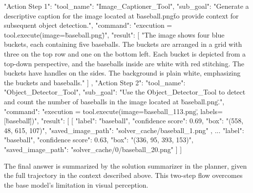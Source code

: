 \begin{answerbox}
\begin{answercodebox}
"Action Step 1": {
    "tool_name": "Image_Captioner_Tool",
    "sub_goal": "Generate a descriptive caption for the image located at \"baseball.png\" to provide context for subsequent object detection.",
    "command": "execution = tool.execute(image=\"baseball.png\")",
    "result": [
        "The image shows four blue buckets, each containing five baseballs. The buckets are arranged in a grid with three on the top row and one on the bottom left. Each bucket is depicted from a top-down perspective, and the baseballs inside are white with red stitching. The buckets have handles on the sides. The background is plain white, emphasizing the buckets and baseballs."
    ]
},
"Action Step 2": {
    "tool_name": "Object_Detector_Tool",
    "sub_goal": "Use the Object_Detector_Tool to detect and count the number of baseballs in the image located at \"baseball.png\".",
    "command": "execution = tool.execute(image=\"baseball_113.png\", labels=[\"baseball\"])",
    "result": [
        [
            {
                "label": "baseball",
                "confidence score": 0.69,
                "box": "(558, 48, 615, 107)",
                "saved_image_path": "solver_cache/baseball_1.png"
            },
            ...
            {
                "label": "baseball",
                "confidence score": 0.63,
                "box": "(336, 95, 393, 153)",
                "saved_image_path": "solver_cache/0/baseball_20.png"
            }
        ]
    ]
}
\end{answercodebox}
\end{answerbox}

The final answer is summarized by the solution summarizer in the planner, given the full trajectory in the context described above. This two-step flow overcomes the base \gpt model’s limitation in visual perception.

